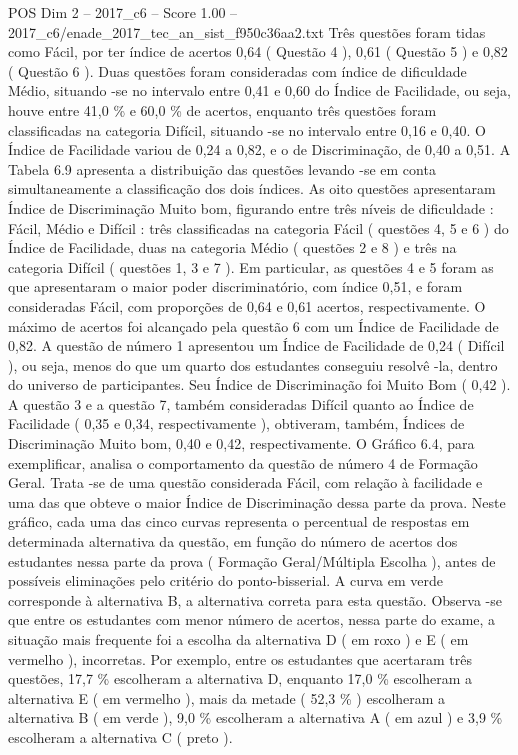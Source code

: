 \begin{textsample}{POS Dim 2 – 2017\_c6 – Score 1.00 – 2017\_c6/enade\_2017\_tec\_an\_sist\_f950c36aa2.txt}
Três questões foram tidas como Fácil, por ter índice de acertos 0,64 ( Questão 4 ), 0,61 ( Questão 5 ) e 0,82 ( Questão 6 ).
Duas questões foram consideradas com índice de dificuldade Médio, situando -se no intervalo entre 0,41 e 0,60 do Índice de Facilidade, ou seja, houve entre 41,0 \% e 60,0 \% de acertos, enquanto três questões foram classificadas na categoria Difícil, situando -se no intervalo entre 0,16 e 0,40.
O Índice de Facilidade variou de 0,24 a 0,82, e o de Discriminação, de 0,40 a 0,51.
A Tabela 6.9 apresenta a distribuição das questões levando -se em conta simultaneamente a classificação dos dois índices.
As oito questões apresentaram Índice de Discriminação Muito bom, figurando entre três níveis de dificuldade : Fácil, Médio e Difícil : três classificadas na categoria Fácil ( questões 4, 5 e 6 ) do Índice de Facilidade, duas na categoria Médio ( questões 2 e 8 ) e três na categoria Difícil ( questões 1, 3 e 7 ).
Em particular, as questões 4 e 5 foram as que apresentaram o maior poder discriminatório, com índice 0,51, e foram consideradas Fácil, com proporções de 0,64 e 0,61 acertos, respectivamente.
O máximo de acertos foi alcançado pela questão 6 com um Índice de Facilidade de 0,82.
A questão de número 1 apresentou um Índice de Facilidade de 0,24 ( Difícil ), ou seja, menos do que um quarto dos estudantes conseguiu resolvê -la, dentro do universo de participantes.
Seu Índice de Discriminação foi Muito Bom ( 0,42 ).
A questão 3 e a questão 7, também consideradas Difícil quanto ao Índice de Facilidade ( 0,35 e 0,34, respectivamente ), obtiveram, também, Índices de Discriminação Muito bom, 0,40 e 0,42, respectivamente.
O Gráfico 6.4, para exemplificar, analisa o comportamento da questão de número 4 de Formação Geral.
Trata -se de uma questão considerada Fácil, com relação à facilidade e uma das que obteve o maior Índice de Discriminação dessa parte da prova.
Neste gráfico, cada uma das cinco curvas representa o percentual de respostas em determinada alternativa da questão, em função do número de acertos dos estudantes nessa parte da prova ( Formação Geral/Múltipla Escolha ), antes de possíveis eliminações pelo critério do ponto-bisserial.
A curva em verde corresponde à alternativa B, a alternativa correta para esta questão.
Observa -se que entre os estudantes com menor número de acertos, nessa parte do exame, a situação mais frequente foi a escolha da alternativa D ( em roxo ) e E ( em vermelho ), incorretas.
Por exemplo, entre os estudantes que acertaram três questões, 17,7 \% escolheram a alternativa D, enquanto 17,0 \% escolheram a alternativa E ( em vermelho ), mais da metade ( 52,3 \% ) escolheram a alternativa B ( em verde ), 9,0 \% escolheram a alternativa A ( em azul ) e 3,9 \% escolheram a alternativa C ( preto ).

\end{textsample}
